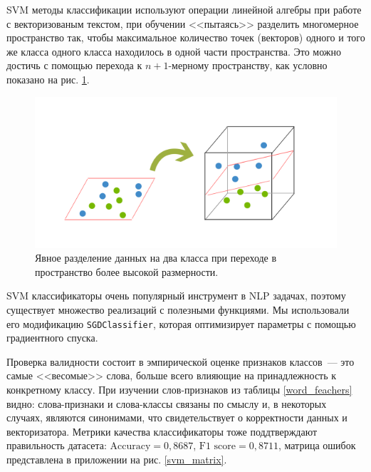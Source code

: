 \documentclass[a4paper, 14pt]{extarticle}
\begin{document}
SVM методы классификации используют операции линейной алгебры при работе с векторизованым текстом, при обучении <<пытаясь>> разделить многомерное пространство так, чтобы максимальное количество точек  (векторов) одного и того же класса одного класса находилось в одной части пространства. Это можно достичь с помощью перехода к $n+1$-мерному пространству, как условно показано на рис. \ref{svm_cond}.

\begin{figure}[h!]
	\centering
	\includegraphics[scale=0.6]{svm_cond}
	\caption{Явное разделение данных на два класса при переходе в пространство более высокой размерности.}
	\label{svm_cond}
\end{figure}

SVM классификаторы очень популярный инструмент в NLP задачах, поэтому существует множество реализаций с полезными функциями. Мы использовали его модификацию \verb+SGDClassifier+, которая оптимизирует параметры с помощью градиентного спуска.

Проверка валидности состоит в эмпирической оценке признаков классов~--- это самые <<весомые>> слова, больше всего влияющие на принадлежность к конкретному классу. При изучении слов-признаков из таблицы \ref{word_feachers} видно: слова-признаки и слова-классы связаны по смыслу и, в некоторых случаях, являются синонимами, что свидетельствует о корректности данных и векторизатора. Метрики качества классификаторы тоже поддтверждают правильность датасета: $\text{Accuracy} = 0,8687$, $\text{F1 score} = 0,8711$, матрица ошибок представлена в приложении на рис. \ref{svm_matrix}.
\end{document}
